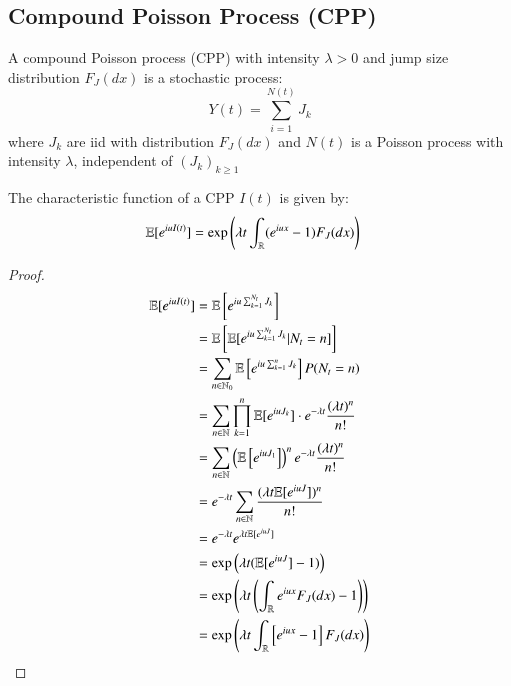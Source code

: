\newpage 

\subsection{Compound Poisson Process (CPP)}

\begin{definition}
\label{def: CPP}
A compound Poisson process (CPP)  with intensity $\lambda > 0$ and jump size distribution $F_{J}(dx)$  is a stochastic process: 
$$
Y(t) = \sum_{i=1}^{N(t)}J_{k}
$$
where $J_{k}$ are iid with distribution $F_{J}(dx)$ and $N(t)$ is a Poisson process with intensity $\lambda$, independent of $(J_{k})_{k\geq 1}$
\end{definition}

\begin{proposition}
\label{prop: characteristic_function_CPP}
The characteristic function of a CPP $I(t)$ is given by: 
\begin{align*}
\mathbb{E}[e^{iuI(t)}] &= \exp\left(
\lambda t \int_{\mathbb{R}}(e^{iux}-1)F_{J}(dx)
\right)    
\end{align*}
\end{proposition} 

\begin{proof}

\begin{align*}
\mathbb{E}[e^{iuI(t)}] &= 
\mathbb{E}\left[
e^{iu \sum_{k=1}^{N_{t}}J_{k}}
\right] \\
&= 
\mathbb{E}\left[\mathbb{E}[e^{iu \sum_{k=1}^{N_{t}}J_{k}}|N_{t}=n]\right] \\ 
&= 
\sum_{n\in \mathbb{N}_{0}}\mathbb{E}\left[e^{iu\sum_{k=1}^{n}J_{k}}\right]P(N_{t}=n) \\
&= 
\sum_{n\in \mathbb{N}}\prod_{k=1}^{n}\mathbb{E}[e^{iuJ_{k}}]\cdot e^{-\lambda t}\frac{(\lambda t)^{n}}{n!} \\ 
&= 
\sum_{n\in \mathbb{N}}\left(
\mathbb{E}\left[e^{iuJ_{1}}\right]
\right)^{n}e^{-\lambda t}\frac{(\lambda t)^{n}}{n!} \\ 
&= 
e^{-\lambda t}\sum_{n \in \mathbb{N}}\frac{
(\lambda t \mathbb{E}[e^{iuJ}])^{n}
}{
n!
} \\ 
&= e^{-\lambda t}e^{\lambda t \mathbb{E}[e^{iuJ}]} \\ 
&= \exp\left(
\lambda t(\mathbb{E}[e^{iuJ}] -1)
\right) \\ 
&= 
\exp\left(
\lambda t \left(\int_{\mathbb{R}}e^{iux}F_{J}(dx) - 1\right) 
\right) \\ 
&= 
\exp\left(
\lambda t \int_{\mathbb{R}}\left[e^{iux}-1 \right]F_{J}(dx)
\right)
\end{align*}

\end{proof}

